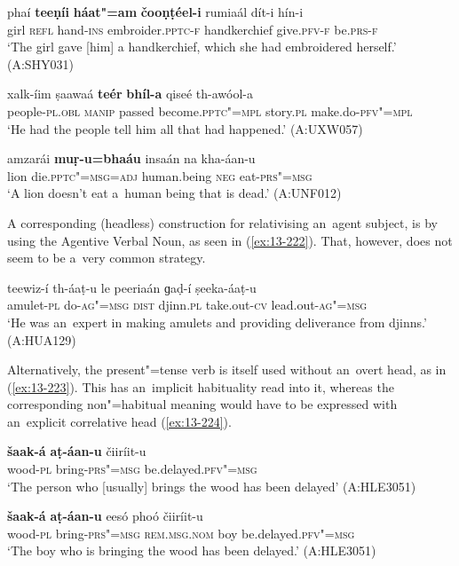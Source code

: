 \begin{exe}
\ex
\label{ex:13-219}
\gll phaí \textbf{teeṇíi} \textbf{háat"=am} \textbf{čooṇṭéel-i} rumiaál dít-i hín-i\\
girl \textsc{refl} hand-\textsc{ins} embroider.\textsc{pptc-f} handkerchief give.\textsc{pfv-f} be.\textsc{prs-f}\\
\glt `The girl gave [him] a handkerchief, which she had embroidered herself.' (A:SHY031)

\ex
\label{ex:13-220}
\gll xalk-íim ṣaawaá \textbf{teér} \textbf{bhíl-a} qiseé  th-awóol-a \\
people-\textsc{pl.obl} \textsc{manip} passed become.\textsc{pptc"=mpl} story.\textsc{pl} make.do-\textsc{pfv"=mpl} \\
\glt `He had the people tell him all that had happened.' (A:UXW057)

\ex
\label{ex:13-221}
\gll amzarái \textbf{muṛ-u=bhaáu} insaán na  kha-áan-u \\
lion die.\textsc{pptc"=msg=adj} human.being \textsc{neg} eat-\textsc{prs"=msg} \\
\glt `A lion doesn't eat a~human being that is dead.' (A:UNF012) 
\end{exe}

A corresponding (headless) construction for relativising an~agent subject, is by using the Agentive Verbal Noun, as seen in (\ref{ex:13-222}). That, however, does not seem to be a~very common strategy. 

\begin{exe}
\ex
\label{ex:13-222}
\gll teewiz-í th-áaṭ-u le peeriaán ɡaḍ-í  ṣeeka-áaṭ-u \\
amulet-\textsc{pl} do-\textsc{ag"=msg} \textsc{dist} djinn.\textsc{pl} take.out-\textsc{cv} lead.out-\textsc{ag"=msg} \\
\glt `He was an~expert in making amulets and providing deliverance from djinns.' (A:HUA129) 
\end{exe}

Alternatively, the present"=tense verb is itself used without an~overt head, as in (\ref{ex:13-223}). This has an~implicit habituality read into it, whereas the corresponding non"=habitual meaning would have to be expressed with an~explicit correlative head (\ref{ex:13-224}).

\begin{exe}
\ex
\label{ex:13-223}
\gll \textbf{šaak-á} \textbf{aṭ-áan-u} čiiríit-u  \\
wood-\textsc{pl} bring-\textsc{prs"=msg} be.delayed.\textsc{pfv"=msg} \\
\glt `The person who [usually] brings the wood has been delayed' (A:HLE3051)

\ex
\label{ex:13-224}
\gll \textbf{šaak-á} \textbf{aṭ-áan-u} eesó phoó čiiríit-u  \\
wood-\textsc{pl} bring-\textsc{prs"=msg} \textsc{rem.ms}\textsc{g.}\textsc{nom} boy be.delayed.\textsc{pfv"=msg}  \\
\glt `The boy who is bringing the wood has been delayed.' (A:HLE3051)
\end{exe}


